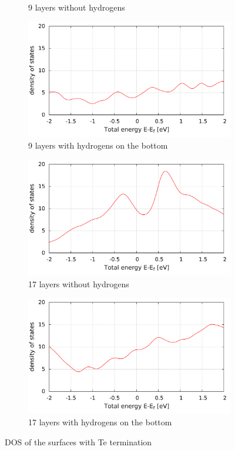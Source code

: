 \begin{figure}[tbp]
\begin{subfigure}[c]{.48\linewidth}
			\caption{9 layers without hydrogens}
		\end{subfigure}
		\hfill
		\begin{subfigure}[c]{.48\linewidth}
			\centering
			\includegraphics[width=\linewidth]{Te_termination/DOS_9_layers_-2_2.pdf}
			\caption{9 layers with hydrogens on the bottom}
		\end{subfigure}
		\begin{subfigure}[c]{.48\linewidth}
			\centering 
			\includegraphics[width=\linewidth]{Te_termination/no_H_DOS_17_layers_-2_2.pdf}
			\caption{17 layers without hydrogens} \label{}
		\end{subfigure}
		\hfill
		\begin{subfigure}[c]{.48\linewidth}
			\centering
			\includegraphics[width=\linewidth]{Te_termination/DOS_17_layers_-2_2.pdf}
			\caption{17 layers with hydrogens on the bottom}
		\end{subfigure}
		\caption{DOS of the surfaces with Te termination} 
		\label{dos_surface_odd_layers_Te}
	\end{figure}
	
